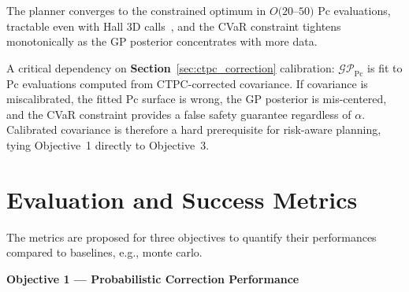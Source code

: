 \documentclass[10pt]{article}
\begin{document}
The planner converges to the constrained optimum in $O(20$--$50)$ Pc evaluations, tractable even with Hall 3D calls~\cite{hall2021_3dnc}, and the CVaR constraint tightens monotonically as the GP posterior concentrates with more data.

A critical dependency on \textbf{Section}~\ref{sec:ctpc_correction} calibration: $\mathcal{GP}_{\text{Pc}}$ is fit to Pc evaluations computed from CTPC-corrected covariance. If covariance is miscalibrated, the fitted Pc surface is wrong, the GP posterior is mis-centered, and the CVaR constraint provides a false safety guarantee regardless of $\alpha$. Calibrated covariance is therefore a hard prerequisite for risk-aware planning, tying Objective~1 directly to Objective~3.

\section{Evaluation and Success Metrics}\label{sec:evaluation}

The metrics are proposed for three objectives to quantify their performances compared to baselines, e.g., monte carlo.

\textbf{Objective 1 — Probabilistic Correction Performance}\label{sec:obj1}
\end{document}
